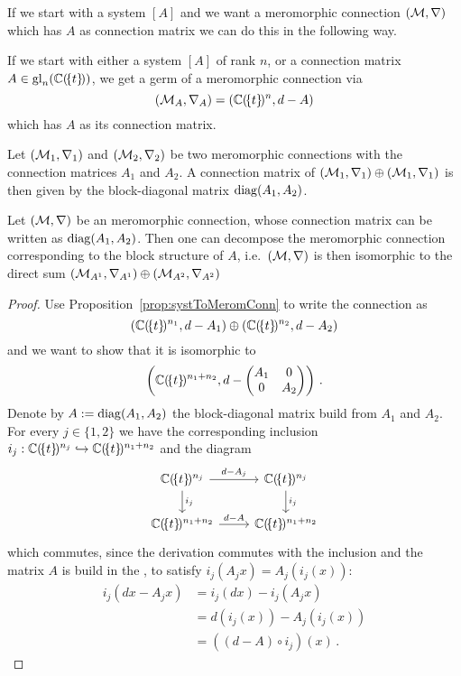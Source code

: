 If we start with a system $[A]$ and we want a meromorphic connection
$(\mathcal{M},\nabla)$ which has $A$ as connection matrix we can do this in the
following way.
\begin{prop}\label{prop:systToMeromConn}
  If we start with either a system $[A]$ of rank $n$, or a connection matrix
  $A\in\operatorname{gl}_n(\mathbb{C}(\!\{t\}\!))$, we get a germ of a meromorphic connection via
  \[
    (\mathcal{M}_A,\nabla_A)=(\mathbb{C}(\!\{t\}\!)^n,d-A)
  \]
  which has $A$ as its connection matrix.
\end{prop}

\begin{prop}\label{prop:MatOfSumOfMerCon}
  Let $(\mathcal{M}_1,\nabla_1)$ and $(\mathcal{M}_2,\nabla_2)$ be two meromorphic
  connections
  with the connection matrices $A_1$ and $A_2$.
  A connection matrix of $(\mathcal{M}_1,\nabla_1)\oplus(\mathcal{M}_1,\nabla_1)$ is then
  given
  by the block-diagonal matrix $\operatorname{diag}(A_1,A_2)$.
  \begin{s-cor}\label{cor:MatOfSumOfMerCon}
    Let $(\mathcal{M},\nabla)$ be an meromorphic connection, whose connection matrix
    can be written as $\operatorname{diag}(A_1,A_2)$.
    Then one can decompose the meromorphic connection corresponding to the block
    structure of $A$, i.e.\ $(\mathcal{M},\nabla)$ is then isomorphic to the direct sum
    $(\mathcal{M}_{A^1},\nabla_{A^1})\oplus(\mathcal{M}_{A^2},\nabla_{A^2})$
  \end{s-cor}
\end{prop}
\begin{proof}
  Use Proposition~\ref{prop:systToMeromConn} to write the connection as
  \[
    (\mathbb{C}(\!\{t\}\!)^{n_1},d-A_1)\oplus(\mathbb{C}(\!\{t\}\!)^{n_2},d-A_2)
  \]
  and we want to show that it is isomorphic to
  \[
    \left(\mathbb{C}(\!\{t\}\!)^{n_1+n_2},d-
    \begin{pmatrix} A_1 & 0 \\0 & A_2 \end{pmatrix}\right) \,.
  \]
  Denote by $A:=\operatorname{diag}(A_1,A_2)$ the block-diagonal matrix build from $A_1$ and
  $A_2$.
  For every $j\in\{1,2\}$ we have the corresponding inclusion
  $i_j:\mathbb{C}(\!\{t\}\!)^{n_j}\hookrightarrow\mathbb{C}(\!\{t\}\!)^{n_1+n_2}$ and the
  diagram
  \[ \begin{tikzcd}
      \C(\!\{t\}\!)^{n_j} \rar{d-A_j}\dar{i_j} & \C(\!\{t\}\!)^{n_j} \dar{i_j}
    \\\C(\!\{t\}\!)^{n_1+n_2} \rar{d-A} & \C(\!\{t\}\!)^{n_1+n_2}
  \end{tikzcd} \]
  which commutes, since the derivation commutes with the inclusion and the
  matrix $A$ is build in the , to satisfy
  $i_j(A_jx)=A_j(i_j(x))$:
  \begin{align*}
    i_j(dx-A_jx) &= i_j(dx)-i_j(A_jx)
    \\&=d(i_j(x))-A_j(i_j(x))
    \\&=((d-A)\circ i_j)(x) \,.
  \end{align*}
\end{proof}

